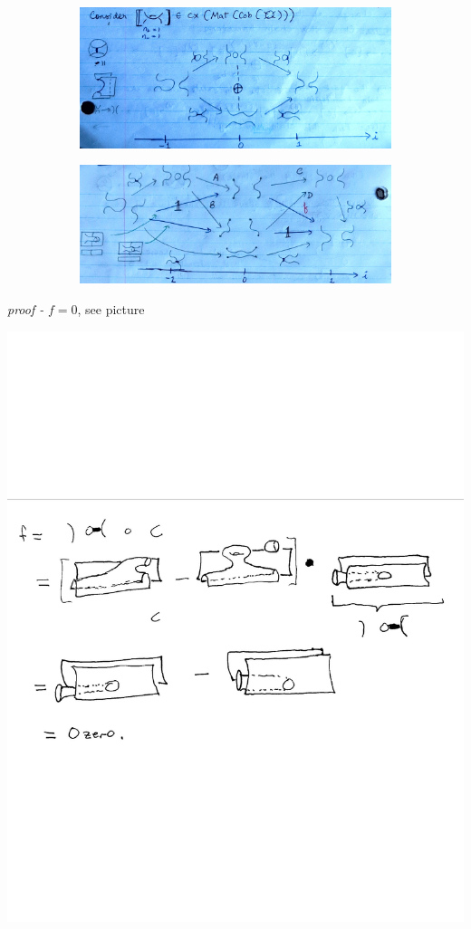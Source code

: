 \documentclass[11pt]{article}
\theoremstyle{definition}
\begin{document}
    \begin{figure}[htbp]
        \centering
        \begin{subfigure}{.5\textwidth}
          \centering
          \includegraphics[width=\linewidth]{additional pdfs/Cob4Delooping1.png}
        \end{subfigure}%
        \begin{subfigure}{.5\textwidth}
          \centering
          \includegraphics[width=\linewidth]{additional pdfs/Cob4Delooping2.png}
        \end{subfigure}
    \end{figure}
    
    \emph{proof - } \(f = 0\), see picture

    \begin{center}
        \includegraphics[width=0.8\linewidth]{additional pdfs/Cob4 delooping computation.pdf}
    \end{center}
    \newpage
    
\end{document}
